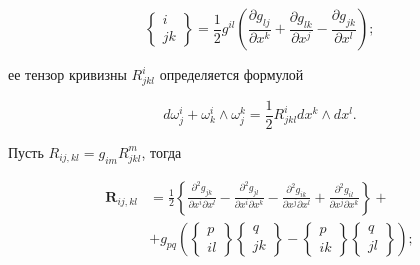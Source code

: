 \documentclass[10pt]{article}
\begin{document}
\[

\left\{\begin{array}{c}

i \\

j k

\end{array}\right\}=\frac{1}{2} g^{i l}\left(\frac{\partial g_{l j}}{\partial x^{k}}+\frac{\partial g_{l k}}{\partial x^{j}}-\frac{\partial g_{j k}}{\partial x^{l}}\right) ;

\]



ее тензор кривизны $R_{j k l}^{i}$ определяется формулой



\[

d \omega_{j}^{i}+\omega_{k}^{i} \wedge \omega_{j}^{k}=\frac{1}{2} R_{j k l}^{i} d x^{k} \wedge d x^{l} .

\]



Пусть $R_{i j, k l}=g_{i m} R_{j k l}^{m}$, тогда



\[

\begin{aligned}

\boldsymbol{R}_{i j, k l} & =\frac{1}{2}\left\{\frac{\partial^{2} g_{j k}}{\partial x^{i} \partial x^{l}}-\frac{\partial^{2} g_{j l}}{\partial x^{i} \partial x^{k}}-\frac{\partial^{2} g_{i k}}{\partial x^{j} \partial x^{l}}+\frac{\partial^{2} g_{i l}}{\partial x^{j} \partial x^{k}}\right\}+ \\

& +g_{p q}\left(\left\{\begin{array}{c}

p \\

i l

\end{array}\right\}\left\{\begin{array}{c}

q \\

j k

\end{array}\right\}-\left\{\begin{array}{c}

p \\

i k

\end{array}\right\}\left\{\begin{array}{c}

q \\

j l

\end{array}\right\}\right) ;

\end{aligned}

\]
\end{document}
